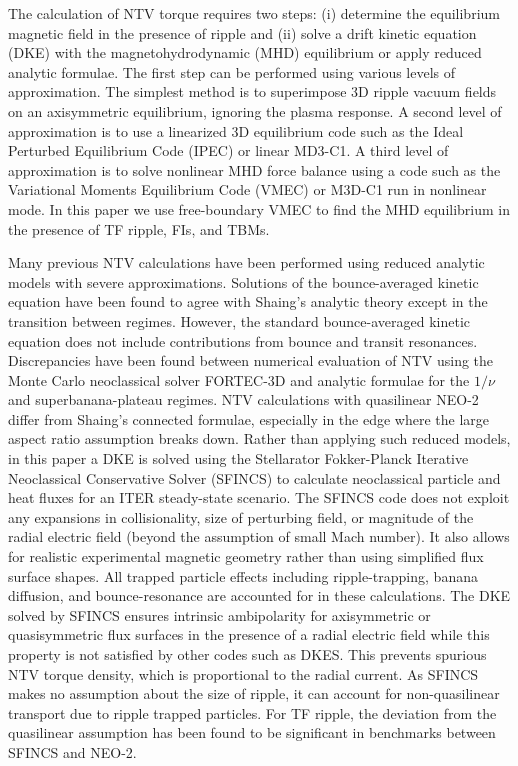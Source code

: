 \documentclass[aip, pop, preprint]{revtex4-1}
\numberwithin{figure}{section}
\numberwithin{equation}{section}
\begin{document}
The calculation of NTV torque requires two steps: (i) determine the equilibrium magnetic field in the presence of ripple and (ii) solve a drift kinetic equation (DKE) with the magnetohydrodynamic (MHD) equilibrium or apply reduced analytic formulae. The first step can be performed using various levels of approximation. The simplest method is to superimpose 3D ripple vacuum fields on an axisymmetric equilibrium, ignoring the plasma response.  A second level of approximation is to use a linearized 3D equilibrium code such as the Ideal Perturbed Equilibrium Code (IPEC)\cite{Park2009} or linear MD3-C1.\cite{Jardin2008} A third level of approximation is to solve nonlinear MHD force balance using a code such as the Variational Moments Equilibrium Code (VMEC)\cite{Hirshman1986a} or M3D-C1\cite{Ferraro2010} run in nonlinear mode. In this paper we use free-boundary VMEC to find the MHD equilibrium in the presence of TF ripple, FIs, and TBMs. 

Many previous NTV calculations\cite{Zhu2006,Hua2010,Cole2011,Park2009} have been performed using reduced analytic models with severe approximations. Solutions of the bounce-averaged kinetic equation have been found to agree with Shaing's analytic theory except in the transition between regimes.\cite{Sun2010} However, the standard bounce-averaged kinetic equation does not include contributions from bounce and transit resonances. Discrepancies have been found between numerical evaluation of NTV using the Monte Carlo neoclassical solver FORTEC-3D and analytic formulae for the $1/\nu$ and superbanana-plateau regimes.\cite{Satake2011a,Satake2011b} NTV calculations with quasilinear NEO-2 differ from Shaing's connected formulae,\cite{Shaing2010} especially in the edge where the large aspect ratio assumption breaks down.\cite{Martitsch2016} Rather than applying such reduced models, in this paper a DKE is solved using the Stellarator Fokker-Planck Iterative Neoclassical Conservative Solver (SFINCS) \cite{Landreman2014} to calculate neoclassical particle and heat fluxes for an ITER steady-state scenario. The SFINCS code does not exploit any expansions in collisionality, size of perturbing field, or magnitude of the radial electric field (beyond the assumption of small Mach number). It also allows for realistic experimental magnetic geometry rather than using simplified flux surface shapes. All trapped particle effects including ripple-trapping,\cite{Stringer1972} banana diffusion,\cite{Linsker1982} and bounce-resonance\cite{Linsker1982} are accounted for in these calculations. The DKE solved by SFINCS ensures intrinsic ambipolarity for axisymmetric or quasisymmetric flux surfaces in the presence of a radial electric field while this property is not satisfied by other codes such as DKES.\cite{Hirshman1986b,Rij1989} This prevents spurious NTV torque density, which is proportional to the radial current. As SFINCS makes no assumption about the size of ripple, it can account for non-quasilinear transport due to ripple trapped particles. For TF ripple, the deviation from the quasilinear assumption has been found to be significant in benchmarks between SFINCS and NEO-2.\cite{Martitsch2016}
\end{document}
